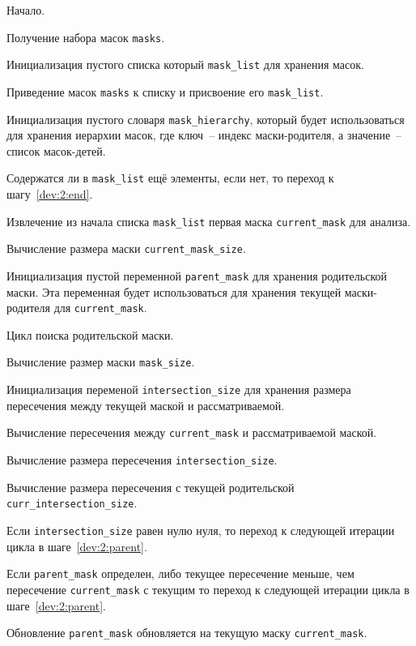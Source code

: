 \begin{enumerate_step}
    \item Начало.
    \item Получение набора масок \lstinline{masks}.
    \item Инициализация пустого списка который \lstinline{mask_list} для хранения масок.
    \item Приведение масок \lstinline{masks} к списку и присвоение его \lstinline{mask_list}.
    \item Инициализация пустого словаря \lstinline{mask_hierarchy}, который будет использоваться для хранения иерархии масок, где ключ~-- индекс маски-родителя, а значение~-- список масок-детей.
    \item \label{dev:2:main_cycle} Содержатся ли в \lstinline{mask_list} ещё элементы, если нет, то переход к шагу~\ref{dev:2:end}.
    \item Извлечение из начала списка \lstinline{mask_list} первая маска \lstinline{current_mask} для анализа.
    \item Вычисление размера маски \lstinline{current_mask_size}.
    \item Инициализация пустой переменной \lstinline{parent_mask} для хранения родительской маски. Эта переменная будет использоваться для хранения текущей маски-родителя для \lstinline{current_mask}.
    \item \label{dev:2:parent} Цикл поиска родительской маски.
    \item Вычисление размер маски \lstinline{mask_size}.
    \item Инициализация переменой \lstinline{intersection_size} для хранения размера пересечения между текущей маской и рассматриваемой.
    \item Вычисление пересечения между \lstinline{current_mask} и рассматриваемой маской.
    \item Вычисление размера пересечения \lstinline{intersection_size}.
    \item Вычисление размера пересечения с текущей родительской \lstinline{curr_intersection_size}.
    \item Если \lstinline{intersection_size} равен нулю нуля, то переход к следующей итерации цикла в шаге~\ref{dev:2:parent}.
    \item Если \lstinline{parent_mask} определен, либо текущее пересечение меньше, чем пересечение \lstinline{current_mask} с текущим то переход к следующей итерации цикла в шаге~\ref{dev:2:parent}.
    \item Обновление \lstinline{parent_mask} обновляется на текущую маску \lstinline{current_mask}.

\end{enumerate_step}
